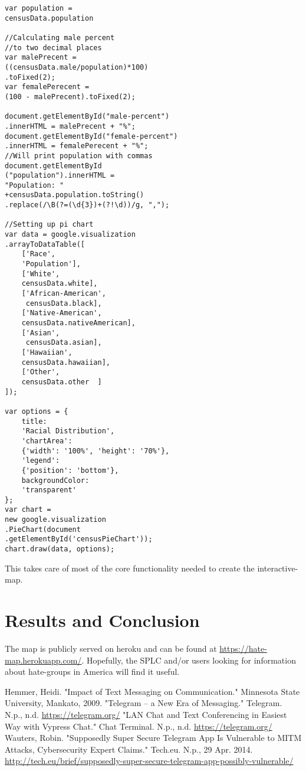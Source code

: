 \documentclass[twoside]{article}
\begin{document}
\begin{multicols}{2}
\begin{verbatim}
var population = 
censusData.population

//Calculating male percent 
//to two decimal places
var malePrecent = 
((censusData.male/population)*100)
.toFixed(2);
var femalePerecent = 
(100 - malePrecent).toFixed(2);

document.getElementById("male-percent")
.innerHTML = malePrecent + "%";
document.getElementById("female-percent")
.innerHTML = femalePerecent + "%";
//Will print population with commas
document.getElementById
("population").innerHTML = 
"Population: " 
+censusData.population.toString()
.replace(/\B(?=(\d{3})+(?!\d))/g, ",");

//Setting up pi chart
var data = google.visualization
.arrayToDataTable([
    ['Race', 
    'Population'],
    ['White',    
    censusData.white],
    ['African-American',     
     censusData.black],
    ['Native-American',  
    censusData.nativeAmerican],
    ['Asian',
     censusData.asian],
    ['Hawaiian',   
    censusData.hawaiian],
    ['Other',
    censusData.other  ]
]);

var options = {
    title: 
    'Racial Distribution',
    'chartArea': 
    {'width': '100%', 'height': '70%'},
    'legend': 
    {'position': 'bottom'},
    backgroundColor: 
    'transparent'
};
var chart = 
new google.visualization
.PieChart(document
.getElementById('censusPieChart'));
chart.draw(data, options);
\end{verbatim}
This takes care of most of the core functionality needed to create the interactive-map.




\section{Results and Conclusion}
The map is publicly served on heroku and can be found at \url{https://hate-map.herokuapp.com/}. Hopefully, the SPLC and/or users looking for information
about hate-groups in America will find it useful.


\begin{thebibliography}{99} %
Hemmer, Heidi. "Impact of Text Messaging on Communication." Minnesota State University, Mankato, 2009.
"Telegram – a New Era of Messaging." Telegram. N.p., n.d.  \href{https://telegram.org/}{https://telegram.org/}
 "LAN Chat and Text Conferencing in Easiest Way with Vypress Chat." Chat Terminal. N.p., n.d.  \href{https://www.census.gov/geo/maps-data/data/tiger.html}{https://telegram.org/}
Wauters, Robin. "Supposedly Super Secure Telegram App Is Vulnerable to MITM Attacks, Cybersecurity Expert Claims." Tech.eu. N.p., 29 Apr. 2014.  \href{http://tech.eu/brief/supposedly-super-secure-telegram-app-possibly-vulnerable/}{http://tech.eu/brief/supposedly-super-secure-telegram-app-possibly-vulnerable/} 


\end{thebibliography}
\end{multicols}
\end{document}
